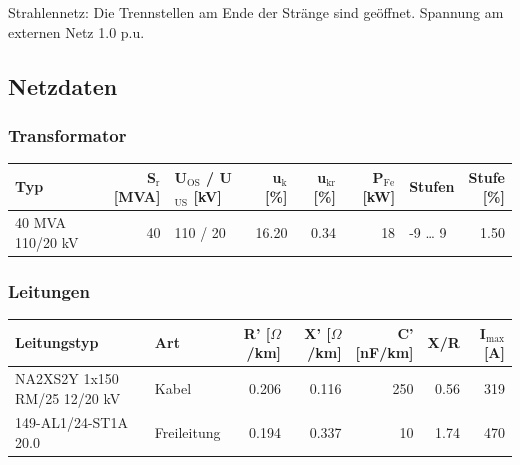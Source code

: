 \documentclass[11pt,a4paper]{article}
\begin{document}
Strahlennetz: Die Trennstellen am Ende der Stränge sind geöffnet. Spannung am externen Netz 1.0 p.u.

\subsection{Netzdaten}

\subsubsection{Transformator}

\begin{table}[H]
\centering
\begin{adjustbox}{max width=\linewidth}
\begin{tabular}{lrlrrrlr}
\toprule
\textbf{Typ} & \thead{S$_\mathrm{r}$ \\ {[MVA]}} & \thead{U$_\mathrm{OS}$ / U$_\mathrm{US}$ \\ {[kV]}} & \thead{u$_\mathrm{k}$ \\ {[\%]}} & \thead{u$_\mathrm{kr}$ \\ {[\%]}} & \thead{P$_\mathrm{Fe}$ \\ {[kW]}} & \textbf{Stufen} & \thead{Stufe \\ {[\%]}} \\
\midrule
40 MVA 110/20 kV & 40 & 110 / 20 & 16.20 & 0.34 & 18 & -9 \dots{} 9 & 1.50 \\
\bottomrule
\end{tabular}
\end{adjustbox}
\end{table}

\subsubsection{Leitungen}

\begin{table}[H]
\centering
\begin{adjustbox}{max width=\linewidth}
\begin{tabular}{llrrrrr}
\toprule
\textbf{Leitungstyp} & \textbf{Art} & \thead{R' \\ {[$\Omega$/km]}} & \thead{X' \\ {[$\Omega$/km]}} & \thead{C' \\ {[nF/km]}} & \textbf{X/R} & \thead{I$_\mathrm{max}$ \\ {[A]}} \\
\midrule
NA2XS2Y 1x150 RM/25 12/20 kV & Kabel & 0.206 & 0.116 & 250 & 0.56 & 319 \\
149-AL1/24-ST1A 20.0 & Freileitung & 0.194 & 0.337 & 10 & 1.74 & 470 \\
\bottomrule
\end{tabular}
\end{adjustbox}
\end{table}
\end{document}
